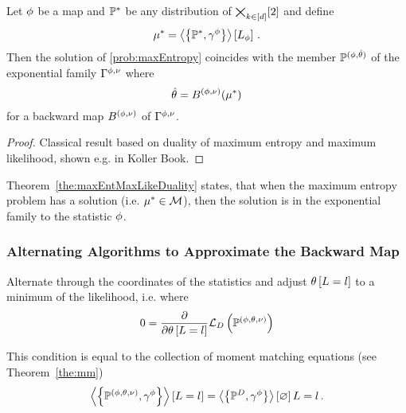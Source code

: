\begin{theorem}\label{the:maxEntMaxLikeDuality}
	Let $\phi$ be a map and $\mathbb{P}^*$ be any distribution of $\bigtimes_{k\in[d]}[2]$ and define
		\[ \mu^* = \left\langle \left\{\mathbb{P}^*,\gamma^{\phi}\right\}\right\rangle \left[ L_{\phi} \right] \, .  \]
	Then the solution of \ref{prob:maxEntropy} coincides with the member $\mathbb{P}^{(\phi,\hat{\theta})}$ of the exponential family $\Gamma^{\phi,\nu}$ where
		\[ \hat{\theta} = B^{(\phi,\nu)}(\mu^*)\]
	for a backward map $B^{(\phi,\nu)}$ of $\Gamma^{\phi,\nu}$.
\end{theorem}
\begin{proof}
	Classical result based on duality of maximum entropy and maximum likelihood, shown e.g. in Koller Book.
\end{proof}

%
Theorem~\ref{the:maxEntMaxLikeDuality} states, that when the maximum entropy problem has a solution (i.e. $\mu^*\in\mathcal{M}$), then the solution is in the exponential family to the statistic $\phi$.



\subsubsection{Alternating Algorithms to Approximate the Backward Map}\label{sec:alternatingBackwardMap}




Alternate through the coordinates of the statistics and adjust $\theta\left[L=l\right]$ to a minimum of the likelihood, i.e. where
\begin{align*}
	0 = \frac{\partial}{\partial \theta\left[L=l\right]} \mathcal{L}_{D}\left(\mathbb{P}^{(\phi,\theta,\nu)}\right)
\end{align*}

This condition is equal to the collection of moment matching equations (see Theorem~\ref{the:mm})
\begin{align*}
	\left\langle \left\{\mathbb{P}^{(\phi,\theta,\nu)},\gamma^{\phi}\right\}\right\rangle \left[ L=l \right] = \left\langle \left\{\mathbb{P}^{D},\gamma^{\phi}\right\}\right\rangle \left[ \varnothing \right]{L=l} \, . 
\end{align*}


